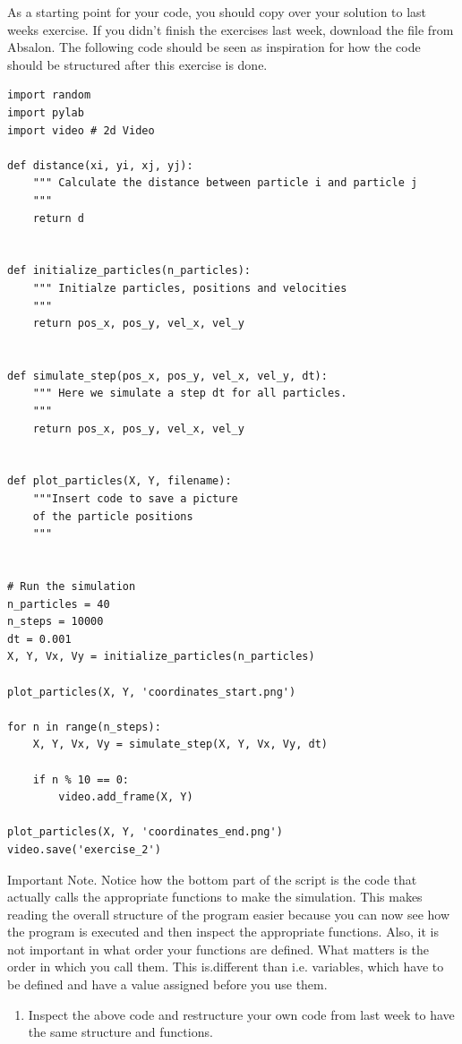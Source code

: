 \documentclass{article}
\begin{document}
As a starting point for your code, you should copy over your solution to last
weeks exercise. If you didn't finish the exercises last week, download the file
 from Absalon. The following code should be seen as
inspiration for how the code should be structured after this exercise is done.

\begin{lstlisting}
import random
import pylab
import video # 2d Video

def distance(xi, yi, xj, yj):
    """ Calculate the distance between particle i and particle j
    """
    return d


def initialize_particles(n_particles):
    """ Initialze particles, positions and velocities
    """
    return pos_x, pos_y, vel_x, vel_y


def simulate_step(pos_x, pos_y, vel_x, vel_y, dt):
    """ Here we simulate a step dt for all particles.
    """
    return pos_x, pos_y, vel_x, vel_y


def plot_particles(X, Y, filename):
    """Insert code to save a picture
    of the particle positions
    """


# Run the simulation
n_particles = 40
n_steps = 10000
dt = 0.001
X, Y, Vx, Vy = initialize_particles(n_particles)

plot_particles(X, Y, 'coordinates_start.png')

for n in range(n_steps):
    X, Y, Vx, Vy = simulate_step(X, Y, Vx, Vy, dt)

    if n % 10 == 0:
        video.add_frame(X, Y)

plot_particles(X, Y, 'coordinates_end.png')
video.save('exercise_2')

\end{lstlisting}

\newpage
Important Note.
Notice how the bottom part of the script is the code that actually calls the
appropriate functions to make the simulation.  This makes reading the overall
structure of the program easier because you can now see how the program is
executed and then inspect the appropriate functions.  Also, it is not important
in what order your functions are defined. What matters is the order in which you
call them. This is.different than i.e. variables, which have to be defined and have a value assigned before you use them.

\begin{enumerate}
  \setcounter{enumi}{0}
  \item Inspect the above code and restructure your own code from last week to have the
    same structure and functions.
\end{enumerate}
\end{document}
